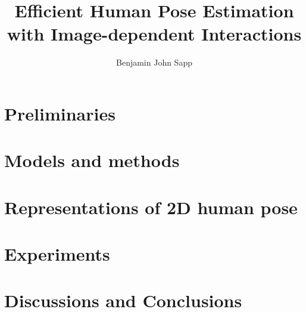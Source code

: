 \documentclass[12pt]{report}%
\theoremstyle{plain} \newtheorem{problem}{Problem}
\begin{document}

\newcommand{\mytitle}{Efficient Human Pose Estimation with Image-dependent 
Interactions}
\newcommand{\MYTITLE}{EFFICIENT HUMAN POSE ESTIMATION WITH IMAGE-DEPENDENT 
INTERACTIONS}

\title{\mytitle}
\author{Benjamin John Sapp}


  
 \beforepreface
\newpage
\copyrightpage
{}

\newpage
\abstractp

\afterpreface
% 

\newpage
{}
\pagestyle{plain}


\part{Preliminaries}




\clearpage
\part{Models and methods}




\clearpage
\part{Representations of 2D human pose}


\clearpage
\part{Experiments}\label{sec:experiments}


\clearpage
\part{Discussions and Conclusions}



\clearpage


\end{document}

